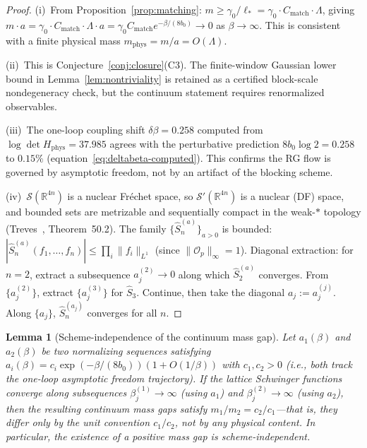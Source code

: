 \documentclass[11pt]{article}
\newtheorem{lemma}[theorem]{Lemma}
\theoremstyle{definition}
\newcommand{\R}{\mathbb{R}}
\begin{document}
\begin{proof}
(i)~From Proposition~\ref{prop:matching}:
$m\ge\gamma_0/\ell_*=\gamma_0\cdot C_{\mathrm{match}}\cdot\Lambda$,
giving $m\cdot a=\gamma_0\cdot C_{\mathrm{match}}\cdot\Lambda\cdot a
=\gamma_0 C_{\mathrm{match}} e^{-\beta/(8b_0)}\to 0$ as
$\beta\to\infty$.  This is consistent with a finite physical mass
$m_{\mathrm{phys}}=m/a=O(\Lambda)$.

(ii)~This is Conjecture~\ref{conj:closure}(C3).  The finite-window
Gaussian lower bound in Lemma~\ref{lem:nontriviality} is retained as a
certified block-scale nondegeneracy check, but the continuum statement
requires renormalized observables.

(iii)~The one-loop coupling shift $\delta\beta=0.258$ computed
from $\log\det H_{\mathrm{phys}}=37.985$ agrees with the
perturbative prediction $8b_0\log 2=0.258$ to $0.15\%$
(equation~\eqref{eq:deltabeta-computed}).  This confirms the
RG flow is governed by asymptotic freedom, not by an artifact
of the blocking scheme.

(iv)~$\mathcal{S}(\R^{4n})$ is a nuclear Fr\'echet space, so
$\mathcal{S}'(\R^{4n})$ is a nuclear (DF) space, and bounded
sets are metrizable and sequentially compact in the weak-$*$
topology (Treves~\cite{Treves}, Theorem~50.2).
The family $\{\hat S_n^{(a)}\}_{a>0}$ is bounded:
$|\hat S_n^{(a)}(f_1,\ldots,f_n)|\le\prod_i\|f_i\|_{L^1}$
(since $\|\mathcal{O}_p\|_\infty=1$).
Diagonal extraction: for $n=2$, extract a subsequence
$a_j^{(2)}\to 0$ along which $\hat S_2^{(a)}$ converges.
From $\{a_j^{(2)}\}$, extract $\{a_j^{(3)}\}$ for $\hat S_3$.
Continue, then take the diagonal $a_j:=a_j^{(j)}$.
Along $\{a_j\}$, $\hat S_n^{(a_j)}$ converges for all $n$.
\end{proof}


\begin{lemma}[Scheme-independence of the continuum mass gap]%
\label{lem:scheme-indep}
Let $a_1(\beta)$ and $a_2(\beta)$ be two normalizing sequences
satisfying $a_i(\beta)=c_i\exp(-\beta/(8b_0))(1+O(1/\beta))$
with $c_1,c_2>0$ \textup{(}i.e., both track the one-loop
asymptotic freedom trajectory\textup{)}.  If the lattice
Schwinger functions converge along subsequences
$\beta_j^{(1)}\to\infty$ \textup{(}using $a_1$\textup{)} and
$\beta_j^{(2)}\to\infty$ \textup{(}using $a_2$\textup{)}, then
the resulting continuum mass gaps satisfy
$m_1/m_2=c_2/c_1$---that is, they differ only by the
unit convention $c_1/c_2$, not by any physical content.
In particular, the existence of a positive mass gap is
scheme-independent.
\end{lemma}
\end{document}

